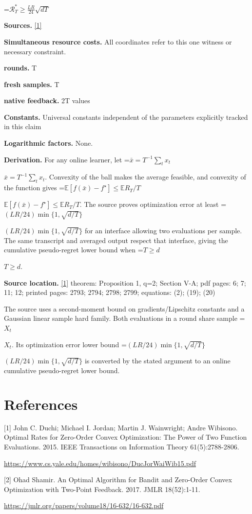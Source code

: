 \documentclass[10pt,a4paper]{article}
\newcommand{\AtlasMath}[1]{\par\begingroup\centering\setbox0=\hbox{$\displaystyle #1$}\ifdim\wd0>1.4\linewidth\typeout{ATLAS WIDE FORMULA: \the\wd0}\fi\ifdim\wd0>\linewidth\resizebox{\linewidth}{!}{\box0}\else\box0\fi\par\endgroup}
\newcommand{\AtlasInlineMath}[1]{\begingroup\setbox0=\hbox{$#1$}\ifdim\wd0>.4\linewidth\endgroup\AtlasMath{#1}\else\endgroup$#1$\fi}
\begin{document}
\AtlasMath{\mathcal{R}_T^*\ge\frac{LR}{24}\sqrt{dT}}
\textbf{Sources.} \href{https://www.cs.yale.edu/homes/wibisono/DucJorWaiWib15.pdf}{[1]}

\textbf{Simultaneous resource costs.} All coordinates refer to this one witness or necessary constraint.

\textbf{rounds.} T

\textbf{fresh samples.} T

\textbf{native feedback.} 2T values

\textbf{Constants.} Universal constants independent of the parameters explicitly tracked in this claim

\textbf{Logarithmic factors.} None.

\textbf{Derivation.} For any online learner, let \AtlasInlineMath{\bar x=T^{-1}\sum_tx_t}. Convexity of the ball makes the average feasible, and convexity of the function gives \AtlasInlineMath{\mathbb E[f(\bar x)-f^\star]\le\mathbb E R_T/T}. The source proves optimization error at least \AtlasInlineMath{(LR/24)\min\{1,\sqrt{d/T}\}} for an interface allowing two evaluations per sample. The same transcript and averaged output respect that interface, giving the cumulative pseudo-regret lower bound when \AtlasInlineMath{T\ge d}.

\textbf{Source location.} \href{https://www.cs.yale.edu/homes/wibisono/DucJorWaiWib15.pdf}{[1]} theorem: Proposition 1, q=2; Section V-A; pdf pages: 6; 7; 11; 12; printed pages: 2793; 2794; 2798; 2799; equations: (2); (19); (20)

The source uses a second-moment bound on gradients/Lipschitz constants and a Gaussian linear sample hard family. Both evaluations in a round share sample \AtlasInlineMath{X_t}. Its optimization error lower bound \AtlasInlineMath{(LR/24)\min\{1,\sqrt{d/T}\}} is converted by the stated argument to an online cumulative pseudo-regret lower bound.

\section{References}
[1] John C. Duchi; Michael I. Jordan; Martin J. Wainwright; Andre Wibisono. Optimal Rates for Zero-Order Convex Optimization: The Power of Two Function Evaluations. 2015. IEEE Transactions on Information Theory 61(5):2788-2806.

\url{https://www.cs.yale.edu/homes/wibisono/DucJorWaiWib15.pdf}

[2] Ohad Shamir. An Optimal Algorithm for Bandit and Zero-Order Convex Optimization with Two-Point Feedback. 2017. JMLR 18(52):1-11.

\url{https://jmlr.org/papers/volume18/16-632/16-632.pdf}
\end{document}
